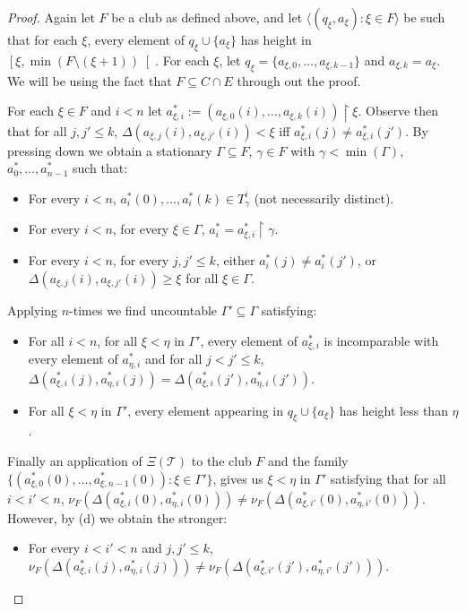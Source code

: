 \documentclass[a4paper,noamsfonts]{amsart}
\theoremstyle{definition}
\newcommand{\seb}{\subseteq}
\newcommand{\setm}{\setminus}
\newcommand{\res}{\!\upharpoonright\!}
\newcommand{\tup}[1]{\langle#1\rangle}
\newcommand{\1}{\mathbf{1}}
\newcommand{\T}{\mathcal{T}}
\newcommand{\prop}{\Xi}
\begin{document}
\begin{proof}
  Again let $F$ be a club as defined above, and let
  $\tup{(q_{\xi},a_{\xi}) : \xi \in F}$ be such that
  for each $\xi$, every element of $q_{\xi} \cup \{a_{\xi}\}$ has height
  in $\left[\xi,\min(F\setm(\xi+1))\right[$. For each $\xi$,
  let $q_{\xi} = \{a_{\xi,0},\dots,a_{\xi,k-1}\}$ and
  $a_{\xi,k} = a_{\xi}$. We will be using the fact that
  $F \seb C \cap E$ through out the proof.

  For each $\xi \in F$ and $i < n$ let
  $a_{\xi,i}^{*} := (a_{\xi,0}(i),\dots,a_{\xi,k}(i))\res \xi$.
  Observe then that for all $j,j' \le k$,
  $\Delta(a_{\xi,j}(i),a_{\xi,j'}(i)) < \xi$ iff
  $a_{\xi,i}^{*}(j) \neq a_{\xi,i}^{*}(j')$. By pressing down
  we obtain a stationary $\Gamma \seb F$,
  $\gamma \in F$ with $\gamma < \min(\Gamma)$,
  $a^{*}_{0},\dots,a^{*}_{n-1}$ such that:
  \begin{itemize}
    \item[(a)] For every $i < n$, $a^{*}_{i}(0),\dots,a^{*}_{i}(k) \in
    T^{i}_{\gamma}$ (not necessarily distinct).
    \item[(b)] For every $i < n$, for every $\xi \in \Gamma$,
    $a^{*}_{i}  = a_{\xi,i}^{*}\res \gamma$.
    \item[(c)] For every $i < n$, for every $j,j' \le k$,
    either $a^{*}_{i}(j) \neq a^{*}_{i}(j')$, or
    $\Delta(a_{\xi,j}(i),a_{\xi,j'}(i)) \ge \xi$ for all
    $\xi \in \Gamma$.
  \end{itemize}
  Applying
   $n$-times we find uncountable
  $\Gamma' \seb \Gamma$ satisfying:
  \begin{itemize}
    \item[(d)] For all $i < n$, for all $\xi < \eta$ in $\Gamma'$,
    every element of $a^{*}_{\xi,i}$ is incomparable with every element
    of $a^{*}_{\eta,i}$ and for all $j < j' \le k$,
    $\Delta(a^{*}_{\xi,i}(j),a^{*}_{\eta,i}(j)) =
    \Delta(a^{*}_{\xi,i}(j'),a^{*}_{\eta,i}(j'))$.
    \item[(e)] For all $\xi < \eta$ in $\Gamma'$,
    every element appearing in $q_{\xi} \cup \{a_{\xi}\}$ has
    height less than $\eta$.
  \end{itemize}
  Finally an application of $\prop(\T)$ to the club $F$ and the family
  $\{(a^{*}_{\xi,0}(0),\dots,a^{*}_{\xi,n-1}(0)) : \xi \in \Gamma'\}$, gives us
  $\xi < \eta$ in $\Gamma'$ satisfying that for all $i < i' < n$,
  $\nu_{F}(\Delta(a^{*}_{\xi,i}(0),a^{*}_{\eta,i}(0))) \neq
  \nu_{F}(\Delta(a^{*}_{\xi,i'}(0),a^{*}_{\eta,i'}(0)))$. However, by
  (d) we obtain the stronger:
  \begin{itemize}
    \item[(f)] For every $i < i' < n$ and $j,j' \le k$,
    $\nu_{F}(\Delta(a^{*}_{\xi,i}(j),a^{*}_{\eta,i}(j))) \neq
    \nu_{F}(\Delta(a^{*}_{\xi,i'}(j'),a^{*}_{\eta,i'}(j')))$.
  \end{itemize}


\end{proof}
\end{document}

